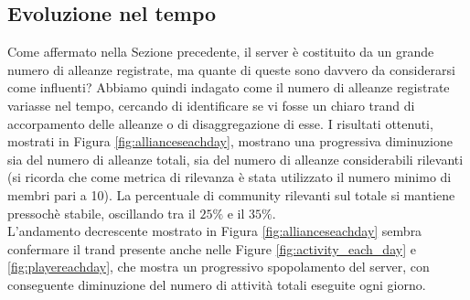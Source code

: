 \newpage
\subsection{Evoluzione nel tempo}
\label{subsec:eot}
Come affermato nella Sezione precedente, il server è costituito da un grande numero di alleanze registrate, ma quante di queste sono davvero da considerarsi come influenti? Abbiamo quindi indagato come il numero di alleanze registrate variasse nel tempo, cercando di identificare se vi fosse un chiaro trand di accorpamento delle alleanze o di disaggregazione di esse. I risultati ottenuti, mostrati in Figura \ref{fig:allianceseachday}, mostrano una progressiva diminuzione sia del numero di alleanze totali, sia del numero di alleanze considerabili rilevanti (si ricorda che come metrica di rilevanza è stata utilizzato il numero minimo di membri pari a 10). La percentuale di community rilevanti sul totale si mantiene pressochè stabile, oscillando tra il $25\%$ e il $35\%$.\\
L'andamento decrescente mostrato in Figura \ref{fig:allianceseachday} sembra confermare il trand presente anche nelle Figure \ref{fig:activity_each_day} e \ref{fig:playereachday}, che mostra un progressivo spopolamento del server, con conseguente diminuzione del numero di attività totali eseguite ogni giorno.\\


